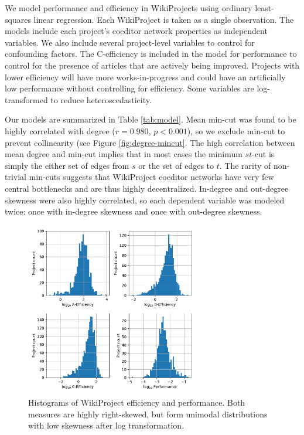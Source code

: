 We model performance and efficiency in WikiProjects using ordinary least-squares linear regression.
Each WikiProject is taken as a single observation.
The models include each project's coeditor network properties as independent variables.
We also include several project-level variables to control for confounding factors.
The C-efficiency is included in the model for performance to control for the presence of articles
that are actively being improved.
Projects with lower efficiency will have more works-in-progress and could have an artificially low
performance without controlling for efficiency.
Some variables are log-transformed to reduce heteroscedasticity.

Our models are summarized in Table \ref{tab:model}.
Mean min-cut was found to be highly correlated with degree ($r=0.980$, $p<0.001$),
so we exclude min-cut to prevent collinearity (see Figure \ref{fig:degree-mincut}.
The high correlation between mean degree and min-cut implies that in most cases
the minimum $st$-cut is simply the either set of edges from $s$ or the set of edges to $t$.
The rarity of non-trivial min-cuts suggests that WikiProject coeditor networks have very few central
bottlenecks and are thus highly decentralized.
In-degree and out-degree skewness were also highly correlated, so each dependent variable was modeled twice:
once with in-degree skewness and once with out-degree skewness.

\begin{figure}
\centering
\includegraphics[width=3in,height=3in]{fig-eff-perf-hist.pdf}
\caption{
Histograms of WikiProject efficiency and performance.
Both measures are highly right-skewed, but form unimodal distributions
with low skewness after log transformation.
\label{fig:eff-perf-hist}
}
\end{figure}

